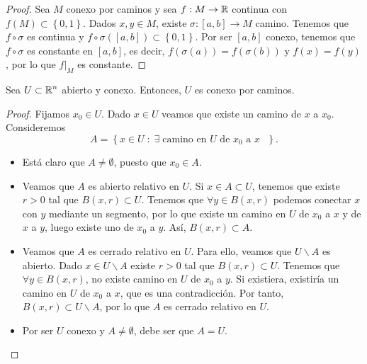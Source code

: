 \begin{proof}
	Sea $\displaystyle M $ conexo por caminos y sea $\displaystyle f : M \to \mathbb{R} $ continua con $\displaystyle f\left(M\right) \subset \left\{ 0,1\right\}  $. Dados $\displaystyle x,y \in M $, existe $\displaystyle \sigma : [a,b] \to M $ camino. Tenemos que $\displaystyle f\circ \sigma  $ es continua y $\displaystyle f\circ \sigma\left( \left[a,b\right] \right) \subset \left\{ 0,1\right\}  $. Por ser $\displaystyle [a,b] $ conexo, tenemos que $\displaystyle f\circ \sigma  $ es constante en $\displaystyle \left[a,b\right]  $, es decir, $\displaystyle f\left(\sigma\left(a\right)\right) = f\left(\sigma\left(b\right)\right) $ y $\displaystyle f\left(x\right) = f\left(y\right) $, por lo que $\displaystyle f|_{M} $ es constante.
\end{proof}
\begin{theorem}
	Sea $\displaystyle U \subset \mathbb{R}^{n} $ abierto y conexo. Entonces, $\displaystyle U $ es conexo por caminos.
\end{theorem}
\begin{proof}
	Fijamos $\displaystyle x_{0} \in U $. Dado $\displaystyle x \in U $ veamos que existe un camino de $\displaystyle x $ a $\displaystyle x_{0} $. Consideremos  
	\[ A = \left\{ x \in U \; : \; \exists \; \text{camino en $\displaystyle U $ de $\displaystyle x_{0} $ a $\displaystyle x $ }\right\} .\]
	\begin{itemize}
	\item Está claro que $\displaystyle A \neq \emptyset $, puesto que $\displaystyle x_{0} \in A $. 
	\item Veamos que $\displaystyle A $ es abierto relativo en $\displaystyle U $. Si $\displaystyle x \in A \subset U $, tenemos que existe $\displaystyle r > 0 $ tal que $\displaystyle B\left(x,r\right) \subset U $. Tenemos que $\displaystyle \forall y \in B\left(x,r\right) $ podemos conectar $\displaystyle x $ con $\displaystyle y $ mediante un segmento, por lo que existe un camino en $\displaystyle U $ de $\displaystyle x_{0} $ a $\displaystyle x $ y de $\displaystyle x $ a $\displaystyle y $, luego existe uno de $\displaystyle x_{0} $ a $\displaystyle y $. Así, $\displaystyle B\left(x,r\right) \subset A $. 
	\item Veamos que $\displaystyle A $ es cerrado relativo en $\displaystyle U $. Para ello, veamos que $\displaystyle U\backslash A $ es abierto. Dado $\displaystyle x \in U\backslash A $ existe $\displaystyle r>0 $ tal que $\displaystyle B\left(x,r\right) \subset U $. Tenemos que $\displaystyle \forall y \in B\left(x,r\right) $, no existe camino en $\displaystyle U $ de $\displaystyle x_{0} $ a $\displaystyle y $. 
		Si existiera, existiría un camino en $\displaystyle U $ de $\displaystyle x_{0} $ a $\displaystyle x $, que es una contradicción. Por tanto, $\displaystyle B\left(x,r\right) \subset U \backslash A $, por lo que $\displaystyle A $ es cerrado relativo en $\displaystyle U $.
	\item Por ser $\displaystyle U $ conexo y $\displaystyle A \neq \emptyset $, debe ser que $\displaystyle A = U $.
	\end{itemize}
\end{proof}
